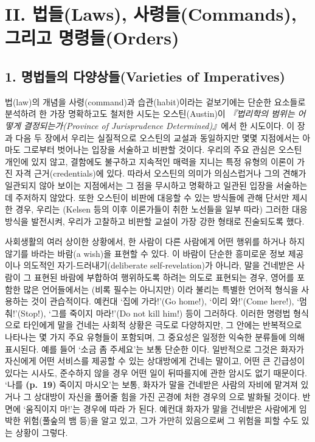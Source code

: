 \section{II. 법들(Laws), 사령들(Commands), 그리고
명령들(Orders)}\label{ii.-uxbc95uxb4e4laws-uxc0acuxb839uxb4e4commands-uxadf8uxb9acuxace0-uxba85uxb839uxb4e4orders}

\subsection{1. 명법들의 다양상들(Varieties of
Imperatives)}\label{uxba85uxbc95uxb4e4uxc758-uxb2e4uxc591uxc0c1uxb4e4varieties-of-imperatives}

법(law)의 개념을 사령(command)과 습관(habit)이라는 겉보기에는 단순한
요소들로 분석하려 한 가장 명확하고도 철저한 시도는 오스틴(Austin)이
\emph{『법리학의 범위는 어떻게 결정되는가(Province of Jurisprudence
Determined)』}에서 한 시도이다. 이 장과 다음 두 장에서 우리는 실질적으로
오스틴의 교설과 동일하지만 몇몇 지점에서는 아마도 그로부터 벗어나는
입장을 서술하고 비판할 것이다. 우리의 주요 관심은 오스틴 개인에 있지
않고, 결함에도 불구하고 지속적인 매력을 지니는 특정 유형의 이론이 가진
자격 근거(credentials)에 있다. 따라서 오스틴의 의미가 의심스럽거나 그의
견해가 일관되지 않아 보이는 지점에서는 그 점을 무시하고 명확하고 일관된
입장을 서술하는 데 주저하지 않았다. 또한 오스틴이 비판에 대응할 수 있는
방식들에 관해 단서만 제시한 경우, 우리는 (Kelsen 등의 이후 이론가들이
취한 노선들을 일부 따라) 그러한 대응 방식을 발전시켜, 우리가 고찰하고
비판할 교설이 가장 강한 형태로 진술되도록 했다.

사회생활의 여러 상이한 상황에서, 한 사람이 다른 사람에게 어떤 행위를
하거나 하지 않기를 바라는 바람(a wish)을 표현할 수 있다. 이 바람이
단순한 흥미로운 정보 제공이나 의도적인 자기-드러내기(deliberate
self-revelation)가 아니라, 말을 건네받은 사람이 그 표현된 바람에
부합하여 행위하도록 하려는 의도로 표현되는 경우, 영어를 포함한 많은
언어들에서는 (비록 필수는 아니지만) 이라
불리는 특별한 언어적 형식을 사용하는 것이 관습적이다. 예컨대 ‘집에
가라!’(Go home!), ‘이리 와!’(Come here!), ‘멈춰!’(Stop!), ‘그를 죽이지
마라!’(Do not kill him!) 등이 그러하다. 이러한 명령법 형식으로 타인에게
말을 건네는 사회적 상황은 극도로 다양하지만, 그 안에는 반복적으로
나타나는 몇 가지 주요 유형들이 포함되며, 그 중요성은 일정한 익숙한
분류들에 의해 표시된다. 예를 들어 ‘소금 좀 주세요’는 보통 단순한
이다. 일반적으로 그것은 화자가 자신에게 어떤
서비스를 제공할 수 있는 상대방에게 건네는 말이고, 어떤 큰 긴급성이
있다는 시사도, 준수하지 않을 경우 어떤 일이 뒤따를지에 관한 암시도 없기
때문이다. ‘나를 \textbf{(p.~19)} 죽이지 마시오’는 보통, 화자가 말을
건네받은 사람의 자비에 맡겨져 있거나 그 상대방이 자신을 풀어줄 힘을 가진
곤경에 처한 경우의 으로 발화될 것이다. 반면에 ‘움직이지
마!’는 경우에 따라 가 된다. 예컨대 화자가 말을
건네받은 사람에게 임박한 위험(풀숲의 뱀 등)을 알고 있고, 그가 가만히
있음으로써 그 위험을 피할 수도 있는 상황이 그렇다.

